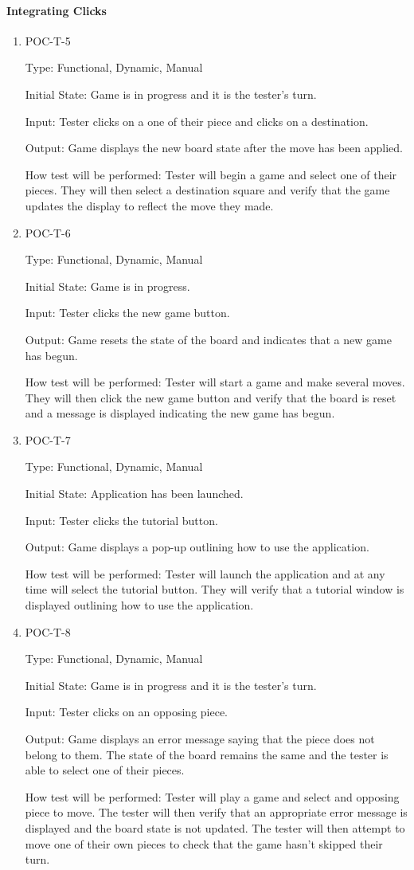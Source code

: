 \documentclass[12pt, titlepage]{article}
\begin{document}
\paragraph{Integrating Clicks}
\begin{enumerate}
    \item{POC-T-5}

    Type: Functional, Dynamic, Manual

    Initial State: Game is in progress and it is the tester's turn.

    Input: Tester clicks on a one of their piece and clicks on a destination.
	
    Output: Game displays the new board state after the move has been applied.
	
    How test will be performed: Tester will begin a game and select one of their pieces. They will then select a destination square and verify that the game updates the display to reflect the move they made.
    \item{POC-T-6}

    Type: Functional, Dynamic, Manual

    Initial State: Game is in progress.

    Input: Tester clicks the new game button.
	
    Output: Game resets the state of the board and indicates that a new game has begun.
	
    How test will be performed: Tester will start a game and make several moves. They will then click the new game button and verify that the board is reset and a message is displayed indicating the new game has begun. 
    \item{POC-T-7}

    Type: Functional, Dynamic, Manual

    Initial State: Application has been launched.

    Input: Tester clicks the tutorial button.
	
    Output: Game displays a pop-up outlining how to use the application.
	
    How test will be performed: Tester will launch the application and at any time will select the tutorial button. They will verify that a tutorial window is displayed outlining how to use the application. 
    \item{POC-T-8}

    Type: Functional, Dynamic, Manual

    Initial State: Game is in progress and it is the tester's turn.

    Input: Tester clicks on an opposing piece.
	
    Output: Game displays an error message saying that the piece does not belong to them. The state of the board remains the same and the tester is able to select one of their pieces.
	
    How test will be performed: Tester will play a game and select and opposing piece to move. The tester will then verify that an appropriate error message is displayed and the board state is not updated. The tester will then attempt to move one of their own pieces to check that the game hasn't skipped their turn. 
\end{enumerate}
\end{document}
